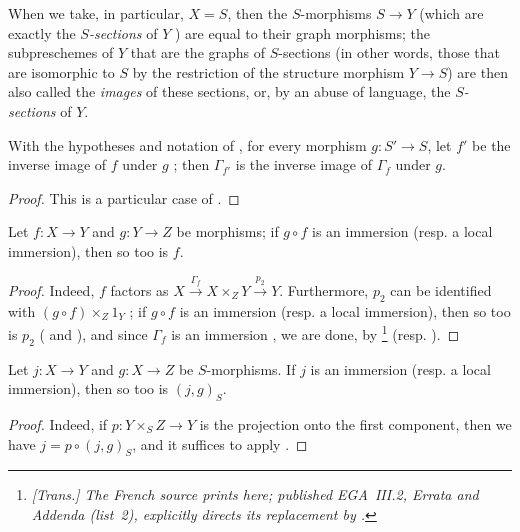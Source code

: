 When we take, in particular, $X=S$, then the $S$-morphisms $S\to Y$ (which are exactly the \emph{$S$-sections} of $Y$ ) are equal to their graph morphisms;
the subpreschemes of $Y$ that are the graphs of $S$-sections (in other words, those that are isomorphic to $S$ by the restriction of the structure morphism $Y\to S$) are then also called the \emph{images} of these sections, or, by an abuse of language, the \emph{$S$-sections} of $Y$.

\begin{corollary}[5.3.12]
\label{I.5.3.12}
With the hypotheses and notation of , for every morphism $g:S'\to S$, let $f'$ be the inverse image of $f$ under $g$ ;
then $\Gamma_{f'}$ is the inverse image of $\Gamma_f$ under $g$.
\end{corollary}

\begin{proof}
This is a particular case of .
\end{proof}

\begin{corollary}[5.3.13]
\label{I.5.3.13}
Let $f:X\to Y$ and $g:Y\to Z$ be morphisms;
if $g\circ f$ is an immersion (resp. a local immersion), then so too is $f$.
\end{corollary}

\begin{proof}
Indeed, $f$ factors as $X\xrightarrow{\Gamma_f}X\times_Z Y\xrightarrow{p_2}Y$.
Furthermore, $p_2$ can be identified with $(g\circ f)\times_Z 1_Y$ ;
if $g\circ f$ is an immersion (resp. a local immersion), then so too is $p_2$ ( and ), and since $\Gamma_f$ is an immersion , we are done, by \footnote{\emph{[Trans.] The French source prints  here; published EGA~III.2, Errata and Addenda (list~2), explicitly directs its replacement by .}} (resp. ).
\end{proof}

\begin{corollary}[5.3.14]
\label{I.5.3.14}
Let $j:X\to Y$ and $g:X\to Z$ be $S$-morphisms.
If $j$ is an immersion (resp. a local immersion), then so too is $(j,g)_S$.
\end{corollary}

\begin{proof}
Indeed, if $p:Y\times_S Z\to Y$ is the projection onto the first component, then we have $j=p\circ(j,g)_S$, and it suffices to apply .
\end{proof}

